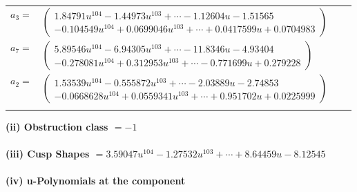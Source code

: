\documentclass[1p]{elsarticle_modified}
\theoremstyle{definition}
\begin{document}
\begin{tabular}{m{7pt} m{180pt} m{7pt} m{180pt} }
\flushright $a_{3}=$&$\begin{pmatrix}1.84791 u^{104}-1.44973 u^{103}+\cdots-1.12604 u-1.51565\\-0.104549 u^{104}+0.0699046 u^{103}+\cdots+0.0417599 u+0.0704983\end{pmatrix}$ \\
\flushright $a_{7}=$&$\begin{pmatrix}5.89546 u^{104}-6.94305 u^{103}+\cdots-11.8346 u-4.93404\\-0.278081 u^{104}+0.312953 u^{103}+\cdots-0.771699 u+0.279228\end{pmatrix}$ \\
\flushright $a_{2}=$&$\begin{pmatrix}1.53539 u^{104}-0.555872 u^{103}+\cdots-2.03889 u-2.74853\\-0.0668628 u^{104}+0.0559341 u^{103}+\cdots+0.951702 u+0.0225999\end{pmatrix}$\\&\end{tabular}
\flushleft \textbf{(ii) Obstruction class $= -1$}\\~\\
\flushleft \textbf{(iii) Cusp Shapes $= 3.59047 u^{104}-1.27532 u^{103}+\cdots+8.64459 u-8.12545$}\\~\\
\newpage\renewcommand{\arraystretch}{1}
\flushleft \textbf{(iv) u-Polynomials at the component}\newline \\
\end{document}
